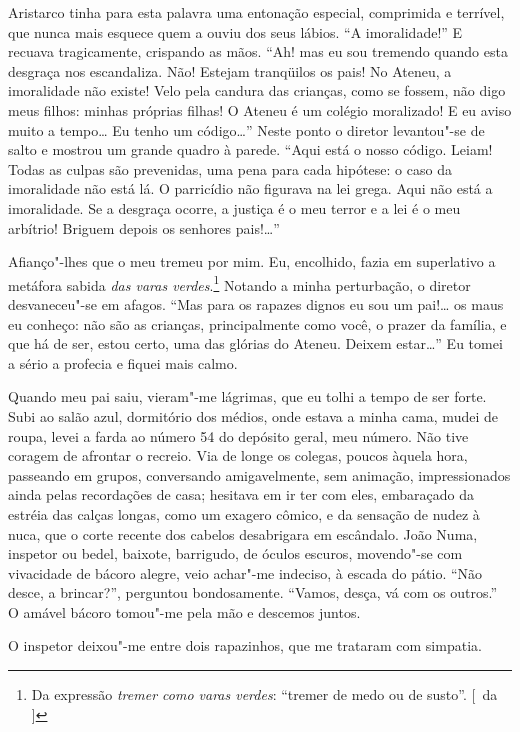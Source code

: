 Aristarco tinha para esta palavra uma
entonação especial, comprimida e terrível, que nunca mais esquece quem
a ouviu dos seus lábios. ``A imoralidade!'' E recuava tragicamente,
crispando as mãos. ``Ah! mas eu sou tremendo quando esta desgraça nos
escandaliza. Não! Estejam tranqüilos os pais! No Ateneu, a imoralidade
não existe! Velo pela candura das crianças, como se fossem, não digo
meus filhos: minhas próprias filhas! O Ateneu é um colégio moralizado!
E eu aviso muito a tempo\ldots{} Eu tenho um código\ldots{}'' Neste ponto o
diretor levantou"-se de salto e mostrou um grande quadro à parede.
``Aqui está o nosso código. Leiam! Todas as culpas são prevenidas, uma
pena para cada hipótese: o caso da imoralidade não está lá. O
parricídio não figurava na lei grega. Aqui não está a imoralidade. Se a
desgraça ocorre, a justiça é o meu terror e a lei é o meu arbítrio!
Briguem depois os senhores pais!\ldots{}'' 

Afianço"-lhes que o meu tremeu
por mim. Eu, encolhido, fazia em superlativo a metáfora sabida 
\textit{das varas verdes}.\footnote{ Da expressão \textit{tremer como varas verdes}: 
``tremer de medo ou de susto''. [~da ]} Notando a minha perturbação, o diretor desvaneceu"-se 
em afagos. ``Mas para os rapazes dignos eu sou um pai!\ldots{} os maus eu
conheço: não são as crianças, principalmente como você, o prazer da
família, e que há de ser, estou certo, uma das glórias do Ateneu.
Deixem estar\ldots{}'' Eu tomei a sério a profecia e fiquei mais calmo.

Quando meu pai saiu, vieram"-me lágrimas, que eu tolhi a tempo de ser
forte. Subi ao salão azul, dormitório dos médios, onde estava a minha
cama, mudei de roupa, levei a farda ao número 54 do depósito geral, meu
número. Não tive coragem de afrontar o recreio. Via de longe os
colegas, poucos àquela hora, passeando em grupos, conversando
amigavelmente, sem animação, impressionados ainda pelas recordações de
casa; hesitava em ir ter com eles, embaraçado da estréia das calças
longas, como um exagero cômico, e da sensação de nudez à nuca, que o
corte recente dos cabelos desabrigara em escândalo. João Numa, inspetor
ou bedel, baixote, barrigudo, de óculos escuros, movendo"-se com
vivacidade de bácoro alegre, veio achar"-me indeciso, à escada do
pátio. ``Não desce, a brincar?'', perguntou bondosamente. ``Vamos, desça,
vá com os outros.'' O amável bácoro tomou"-me pela mão e descemos juntos. 

O inspetor deixou"-me entre dois rapazinhos, que me trataram
com simpatia. 

